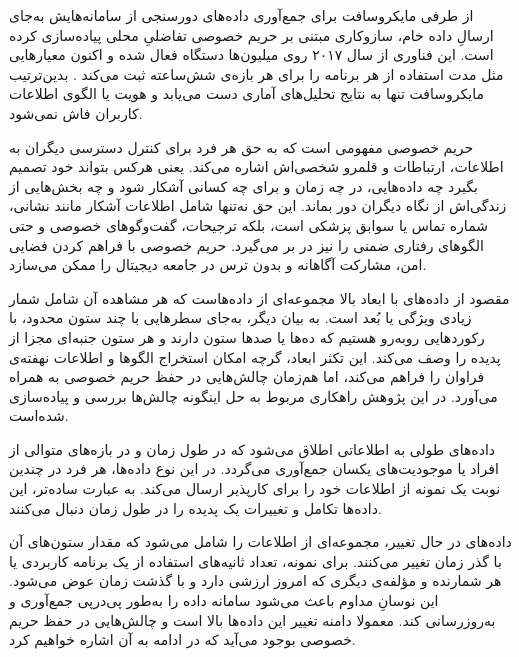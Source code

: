 از طرفی مایکروسافت برای جمع‌آوری داده‌های دورسنجی از سامانه‌هایش به‌جای ارسالِ داده خام، سازوکاری مبتنی بر حریم خصوصی تفاضلیِ محلی پیاده‌سازی کرده است. این فناوری از سال ۲۰۱۷ روی میلیون‌ها دستگاه فعال شده و اکنون معیارهایی مثل مدت استفاده از هر برنامه را برای هر بازه‌ی شش‌ساعته ثبت می‌کند .  بدین‌ترتیب مایکروسافت تنها به نتایج تحلیل‌های آماری دست می‌یابد و هویت یا الگوی اطلاعات کاربران فاش نمی‌شود.



حریم خصوصی مفهومی است که به حق هر فرد برای کنترل دسترسی دیگران به اطلاعات، ارتباطات و قلمرو شخصی‌اش اشاره می‌کند. یعنی هرکس بتواند خود تصمیم بگیرد چه داده‌هایی، در چه زمان و برای چه کسانی آشکار شود و چه بخش‌هایی از زندگی‌اش از نگاه دیگران دور بماند. این حق نه‌تنها شامل اطلاعات آشکار مانند نشانی، شماره تماس یا سوابق پزشکی است، بلکه ترجیحات، گفت‌وگوهای خصوصی و حتی الگوهای رفتاری ضمنی را نیز در بر می‌گیرد. حریم خصوصی با فراهم کردن فضایی امن، مشارکت آگاهانه و بدون ترس در جامعه دیجیتال را ممکن می‌سازد.


مقصود از داده‌های با ابعاد بالا مجموعه‌ای از داده‌هاست که هر مشاهده آن شامل شمار زیادی ویژگی یا بُعد است. به بیان دیگر، به‌جای سطرهایی با چند ستون محدود، با رکوردهایی روبه‌رو هستیم که ده‌ها یا صدها ستون دارند و هر ستون جنبه‌ای مجزا از پدیده را وصف می‌کند. این تکثر ابعاد، گرچه امکان استخراج الگوها و اطلاعات نهفته‌ی فراوان را فراهم می‌کند، اما هم‌زمان چالش‌هایی در حفظ حریم خصوصی به همراه می‌آورد. در این پژوهش راهکاری مربوط به حل اینگونه چالش‌ها بررسی و پیاده‌سازی شده‌است.


داده‌های طولی به اطلاعاتی اطلاق می‌شود که در طول زمان و در بازه‌های متوالی از افراد یا موجودیت‌های یکسان جمع‌آوری می‌گردد. در این نوع داده‌ها، هر فرد در چندین نوبت یک نمونه از اطلاعات خود را برای کارپذیر ارسال می‌کند. به عبارت ساده‌تر، این داده‌ها تکامل و تغییرات یک پدیده را در طول زمان دنبال می‌کنند.


داده‌های در حال تغییر، مجموعه‌ای از اطلاعات را شامل می‌شود که مقدار ستون‌های آن با گذر زمان تغییر می‌کنند. برای نمونه، تعداد ثانیه‌های استفاده از یک برنامه کاربردی یا هر شمارنده و مؤلفه‌ی دیگری که امروز ارزشی دارد و با گذشت زمان عوض می‌شود. این نوسانِ مداوم باعث می‌شود سامانه داده را به‌طور پی‌درپی جمع‌آوری و به‌روزرسانی کند. معمولا دامنه تغییر این داده‌ها بالا است و چالش‌هایی در حفظ حریم خصوصی بوجود می‌آید که در ادامه به آن اشاره خواهیم کرد. 

